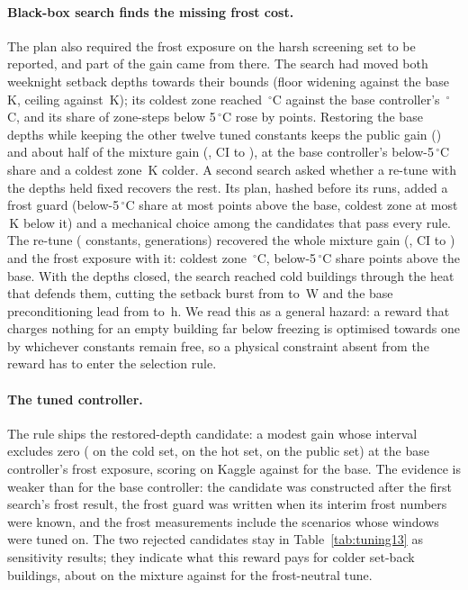 \paragraph{Black-box search finds the missing frost cost.} The plan also required the frost exposure on the harsh screening set to be reported, and part of the gain came from there. The search had moved both weeknight setback depths towards their bounds (floor widening \RTwCandNightLow{} against the base \RTwVTwelveNightLow\,K, ceiling \RTwCandNightHigh{} against \RTwVTwelveNightHigh\,K); its coldest zone reached \RTwCandColdest\,$^\circ$C against the base controller's \RTwVTwelveColdest\,$^\circ$C, and its share of zone-steps below 5\,$^\circ$C rose by \RTwCandBelowFiveRise{} points. Restoring the base depths while keeping the other twelve tuned constants keeps the public gain (\RTwVarPub) and about half of the mixture gain (\RTwVarMix, CI \RTwVarMixLo{} to \RTwVarMixHi), at the base controller's below-5\,$^\circ$C share and a coldest zone \RTwVarColderK\,K colder. A second search asked whether a re-tune with the depths held fixed recovers the rest. Its plan, hashed before its runs, added a frost guard (below-5\,$^\circ$C share at most \RTwGuardPP{} points above the base, coldest zone at most \RTwGuardK\,K below it) and a mechanical choice among the candidates that pass every rule. The re-tune (\RTwNParamsThr{} constants, \RTwGensThr{} generations) recovered the whole mixture gain (\RTwThrMix, CI \RTwThrMixLo{} to \RTwThrMixHi) and the frost exposure with it: coldest zone \RTwThrColdest\,$^\circ$C, below-5\,$^\circ$C share \RTwThrBelowFiveRise{} points above the base. With the depths closed, the search reached cold buildings through the heat that defends them, cutting the setback burst from \RTwVarQSb{} to \RTwThrQSb\,W and the base preconditioning lead from \RTwVarLeadBase{} to \RTwThrLeadBase\,h. We read this as a general hazard: a reward that charges nothing for an empty building far below freezing is optimised towards one by whichever constants remain free, so a physical constraint absent from the reward has to enter the selection rule.

\paragraph{The tuned controller.} The rule ships the restored-depth candidate: a modest gain whose interval excludes zero (\RTwVarHCThree{} on the cold set, \RTwVarHH{} on the hot set, \RTwVarPub{} on the public set) at the base controller's frost exposure, scoring \RTwKagVThirteen{} on Kaggle against \RTenKagVTwelve{} for the base. The evidence is weaker than for the base controller: the candidate was constructed after the first search's frost result, the frost guard was written when its interim frost numbers were known, and the frost measurements include the scenarios whose windows were tuned on. The two rejected candidates stay in Table~\ref{tab:tuning13} as sensitivity results; they indicate what this reward pays for colder set-back buildings, about \RTwCandMixAbs{} on the mixture against \RTwVarMixAbs{} for the frost-neutral tune.

